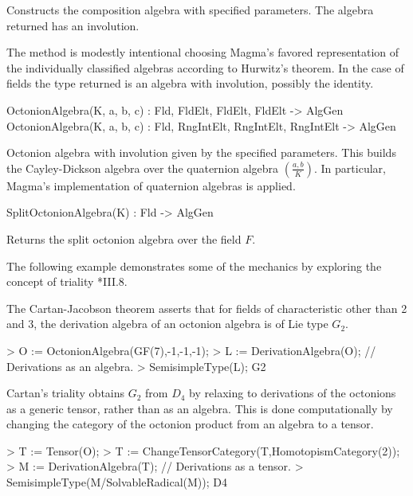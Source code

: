 Constructs the composition algebra with specified parameters.  The algebra returned
has an involution.  

The method is modestly intentional choosing Magma's favored representation of
the individually classified algebras according to Hurwitz's theorem.  In the case of
fields the type returned is an algebra with involution, possibly the identity.


\begin{intrinsics}
OctonionAlgebra(K, a, b, c) : Fld, FldElt, FldElt, FldElt -> AlgGen
OctonionAlgebra(K, a, b, c) : Fld, RngIntElt, RngIntElt, RngIntElt -> AlgGen
\end{intrinsics}

Octonion algebra with involution given by the specified parameters.
This builds the Cayley-Dickson algebra over the quaternion algebra
$\left(\frac{a,b}{K}\right)$.  In particular, Magma's implementation
of quaternion algebras is applied.

\begin{intrinsics}
SplitOctonionAlgebra(K) : Fld -> AlgGen
\end{intrinsics}

Returns the split octonion algebra over the field $F$.


\begin{example}
The following example demonstrates some of the mechanics by exploring
the concept of triality \cite{Schafer}*{III.8}.

The Cartan-Jacobson theorem asserts that for fields of characteristic other
than 2 and 3, the derivation algebra of an octonion algebra is of Lie type 
$G_2$.

\begin{code}
> O := OctonionAlgebra(GF(7),-1,-1,-1);
> L := DerivationAlgebra(O);   // Derivations as an algebra.
> SemisimpleType(L);
G2
\end{code}

Cartan's triality obtains $G_2$ from $D_4$ by relaxing to
derivations of the octonions as a generic tensor, rather than as an 
algebra.  
This is done computationally by changing the category of the octonion product
from an algebra to a tensor.

\begin{code}
> T := Tensor(O);
> T := ChangeTensorCategory(T,HomotopismCategory(2)); 
> M := DerivationAlgebra(T);  // Derivations as a tensor.
> SemisimpleType(M/SolvableRadical(M));
D4
\end{code}
\end{example}

